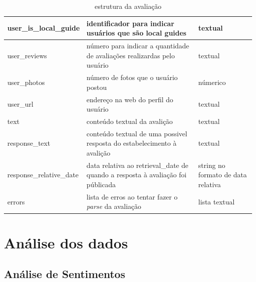 \begin{table}[]
\begin{tabular}{|l|p{5cm}|p{5cm}|}
		\hline
		user\_is\_local\_guide    & identificador para indicar usuários que são local guides                        & textual                                                                        \\
		\hline
		user\_reviews             & número para indicar a quantidade de avaliações realizardas pelo usuário         & textual                                                                        \\
		\hline
		user\_photos              & número de fotos que o usuário postou                                            & númerico                                                                       \\
		\hline
		user\_url                 & endereço na web do perfil do usuário                                            & textual                                                                        \\
		\hline
		text                      & conteúdo textual da avalição                                                    & textual                                                                        \\
		\hline
		response\_text            & conteúdo textual de uma possivel resposta do estabelecimento à avalição         & textual                                                                        \\
		\hline
		response\_relative\_date  & data relativa ao retrieval\_date de quando a resposta à avaliação foi públicada & string no formato de data relativa                                             \\
		\hline
		errors                    & lista de erros ao tentar fazer o \emph{parse} da avaliação                      & lista textual                                                                  \\
		\hline
	\end{tabular}
	\caption{estrutura da avaliação}
	\label{tab:estrutura_review}
\end{table}
\section{Análise dos dados}

\subsection{Análise de Sentimentos}
\label{subsec:analise_sentimentos}

